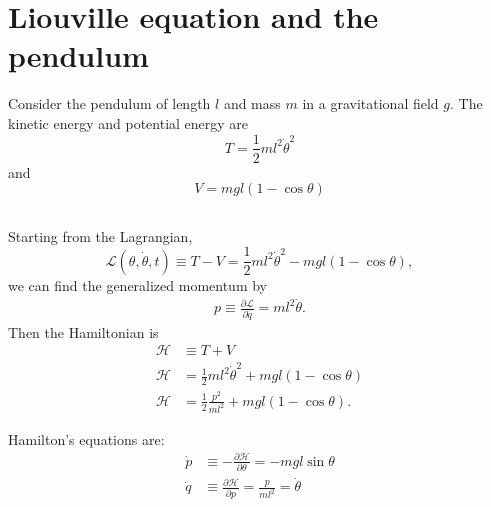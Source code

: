 \section{Liouville equation and the pendulum}

Consider the pendulum of length $l$ and mass $m$ in a gravitational field
$g$. The kinetic energy and potential energy are
\begin{equation}
    T=\frac{1}{2}ml^2\dot{\theta}^2
\end{equation}
and 
\begin{equation}
    V=mgl(1-\cos\theta)
\end{equation}

\subsection{}
Starting from the Lagrangian, 
\begin{equation*}
    \mathcal{L}(\theta,\dot{\theta},t)\equiv T-V = \frac{1}{2}ml^2\dot{\theta}^2 - mgl(1 - \cos\theta),
\end{equation*}
we can find the generalized momentum by
\begin{align*}
    p\equiv\frac{\partial\mathcal{L}}{\partial\dot{q}}=ml^2\dot{\theta}.
\end{align*}
Then the Hamiltonian is
\begin{align*}
    \mathcal{H}&\equiv T+V\\
    \mathcal{H}&=\frac{1}{2}ml^2\dot{\theta}^2+mgl(1-\cos\theta)\\
    \mathcal{H}&=\frac{1}{2}\frac{p^2}{ml^2}+mgl(1-\cos\theta).
\end{align*}

Hamilton's equations are:
\begin{align*}
    \dot{p}&\equiv-\frac{\partial\mathcal{H}}{\partial\theta}=-mgl\sin\theta\\
    \dot{q}&\equiv\frac{\partial\mathcal{H}}{\partial p}=\frac{p}{ml^2}=\dot{\theta}
\end{align*}


